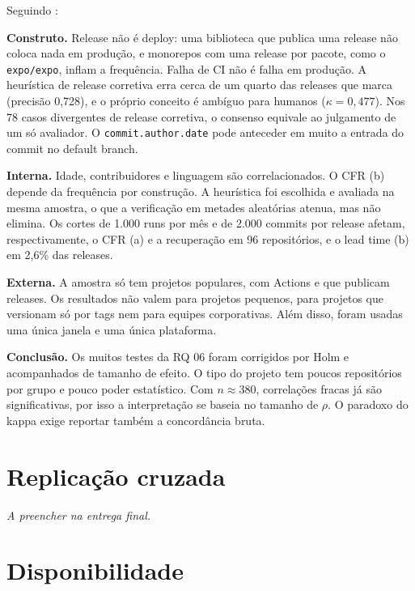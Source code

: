 \documentclass[12pt]{article}
\begin{document}
Seguindo \cite{wohlin2012}:

\textbf{Construto.} Release não é deploy: uma biblioteca que publica uma release não coloca nada em produção, e monorepos com uma release por pacote, como o \texttt{expo/expo}, inflam a frequência. Falha de CI não é falha em produção. A heurística de release corretiva erra cerca de um quarto das releases que marca (precisão 0,728), e o próprio conceito é ambíguo para humanos ($\kappa = 0{,}477$). Nos 78 casos divergentes de release corretiva, o consenso equivale ao julgamento de um só avaliador. O \texttt{commit.author.date} pode anteceder em muito a entrada do commit no default branch.

\textbf{Interna.} Idade, contribuidores e linguagem são correlacionados. O CFR (b) depende da frequência por construção. A heurística foi escolhida e avaliada na mesma amostra, o que a verificação em metades aleatórias atenua, mas não elimina. Os cortes de 1.000 runs por mês e de 2.000 commits por release afetam, respectivamente, o CFR (a) e a recuperação em 96 repositórios, e o lead time (b) em 2,6\% das releases.

\textbf{Externa.} A amostra só tem projetos populares, com Actions e que publicam releases. Os resultados não valem para projetos pequenos, para projetos que versionam só por tags nem para equipes corporativas. Além disso, foram usadas uma única janela e uma única plataforma.

\textbf{Conclusão.} Os muitos testes da RQ 06 foram corrigidos por Holm e acompanhados de tamanho de efeito. O tipo do projeto tem poucos repositórios por grupo e pouco poder estatístico. Com $n \approx 380$, correlações fracas já são significativas, por isso a interpretação se baseia no tamanho de $\rho$. O paradoxo do kappa exige reportar também a concordância bruta.

\section{Replicação cruzada}

\textit{A preencher na entrega final.}

\section{Disponibilidade}
\end{document}
